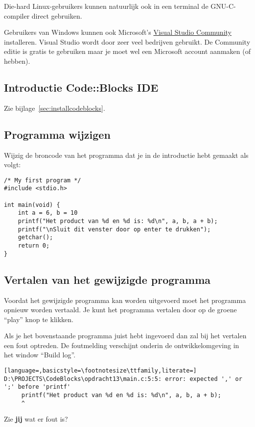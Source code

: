 \documentclass[a4paper,10pt,fleqn,twoside]{article}
\begin{document}
Die-hard Linux-gebruikers kunnen natuurlijk ook in een terminal de GNU-C-compiler direct gebruiken.

Gebruikers van Windows kunnen ook Microsoft’s \href{https://visualstudio.microsoft.com/vs/community/}{Visual Studio Community} installeren. Visual Studio wordt door zeer veel bedrijven gebruikt. De Community editie is gratis te gebruiken maar je moet wel een Microsoft account aanmaken (of hebben).

\subsection{Introductie Code::Blocks IDE}

Zie bijlage~\ref{sec:installcodeblocks}.

\subsection{Programma wijzigen}
Wijzig de broncode van het programma dat je in de introductie hebt gemaakt als volgt:

\begin{lstlisting}
/* My first program */
#include <stdio.h>

int main(void) {
    int a = 6, b = 10
    printf("Het product van %d en %d is: %d\n", a, b, a + b);
    printf("\nSluit dit venster door op enter te drukken");
    getchar();
    return 0;
}
\end{lstlisting}

\subsection{Vertalen van het gewijzigde programma
}Voordat het gewijzigde programma kan worden uitgevoerd moet het programma opnieuw worden vertaald. Je kunt het programma vertalen door op de groene ``play'' knop te klikken.

Als je het bovenstaande programma juist hebt ingevoerd dan zal bij het vertalen een fout optreden. De foutmelding verschijnt onderin de ontwikkelomgeving in het window ``Build log''. 

\begin{lstlisting}[language=,basicstyle=\footnotesize\ttfamily,literate=]
D:\PROJECTS\CodeBlocks\opdracht13\main.c:5:5: error: expected ',' or ';' before 'printf'
     printf("Het product van %d en %d is: %d\n", a, b, a + b);
     ^
\end{lstlisting}

Zie \textbf{jij} wat er fout is?
\end{document}
